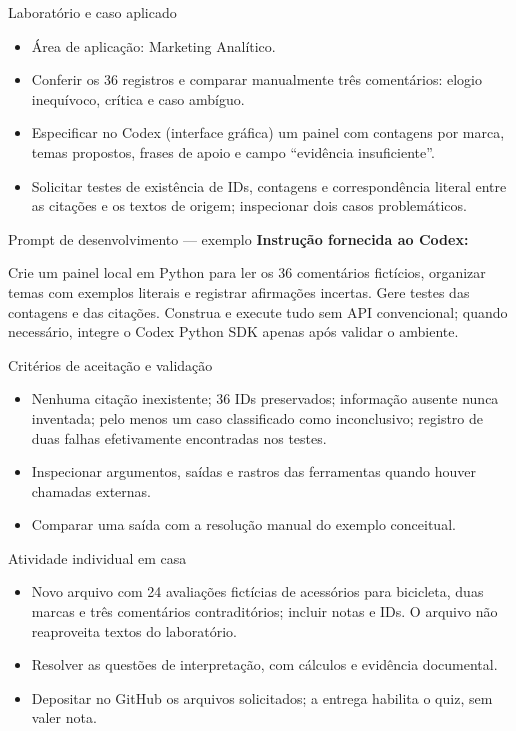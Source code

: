 \documentclass[10pt,aspectratio=169]{beamer}
\begin{document}
\begin{frame}[t]{Laboratório e caso aplicado}
\small
\begin{itemize}
\item Área de aplicação: Marketing Analítico.
\item Conferir os 36 registros e comparar manualmente três comentários: elogio inequívoco, crítica e caso ambíguo.
\item Especificar no Codex (interface gráfica) um painel com contagens por marca, temas propostos, frases de apoio e campo ``evidência insuficiente''.
\item Solicitar testes de existência de IDs, contagens e correspondência literal entre as citações e os textos de origem; inspecionar dois casos problemáticos.
\end{itemize}
\end{frame}

\begin{frame}[t]{Prompt de desenvolvimento — exemplo}
\small
\small\textbf{Instrução fornecida ao Codex:}\par\vspace{5mm}Crie um painel local em Python para ler os 36 comentários fictícios, organizar temas com exemplos literais e registrar afirmações incertas. Gere testes das contagens e das citações. Construa e execute tudo sem API convencional; quando necessário, integre o Codex Python SDK apenas após validar o ambiente.
\end{frame}

\begin{frame}[t]{Critérios de aceitação e validação}
\small
\begin{itemize}
\item Nenhuma citação inexistente; 36 IDs preservados; informação ausente nunca inventada; pelo menos um caso classificado como inconclusivo; registro de duas falhas efetivamente encontradas nos testes.
\item Inspecionar argumentos, saídas e rastros das ferramentas quando houver chamadas externas.
\item Comparar uma saída com a resolução manual do exemplo conceitual.
\end{itemize}
\end{frame}

\begin{frame}[t]{Atividade individual em casa}
\small
\begin{itemize}
\item Novo arquivo com 24 avaliações fictícias de acessórios para bicicleta, duas marcas e três comentários contraditórios; incluir notas e IDs. O arquivo não reaproveita textos do laboratório.
\item Resolver as questões de interpretação, com cálculos e evidência documental.
\item Depositar no GitHub os arquivos solicitados; a entrega habilita o quiz, sem valer nota.
\end{itemize}
\end{frame}
\end{document}
